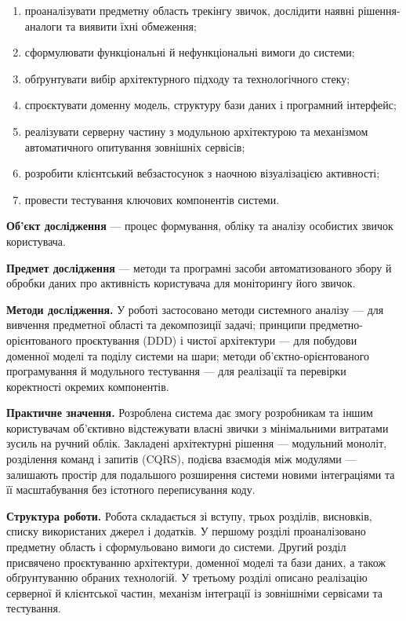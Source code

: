 \begin{enumerate}[noitemsep, topsep=2pt, leftmargin=*, label=\arabic*)]
    \item проаналізувати предметну область трекінгу звичок, дослідити наявні рішення-аналоги та виявити їхні обмеження;
    \item сформулювати функціональні й нефункціональні вимоги до системи;
    \item обґрунтувати вибір архітектурного підходу та технологічного стеку;
    \item спроєктувати доменну модель, структуру бази даних і програмний інтерфейс;
    \item реалізувати серверну частину з модульною архітектурою та механізмом автоматичного опитування зовнішніх сервісів;
    \item розробити клієнтський вебзастосунок з наочною візуалізацією активності;
    \item провести тестування ключових компонентів системи.
\end{enumerate}

\textbf{Об'єкт дослідження} — процес формування, обліку та аналізу особистих звичок користувача.

\textbf{Предмет дослідження} — методи та програмні засоби автоматизованого збору й обробки даних про активність користувача для моніторингу його звичок.

\textbf{Методи дослідження.} У роботі застосовано методи системного аналізу — для вивчення предметної області та декомпозиції задачі; принципи предметно-орієнтованого проєктування (DDD) і чистої архітектури — для побудови доменної моделі та поділу системи на шари; методи об'єктно-орієнтованого програмування й модульного тестування — для реалізації та перевірки коректності окремих компонентів.

\textbf{Практичне значення.} Розроблена система дає змогу розробникам та іншим користувачам об'єктивно відстежувати власні звички з мінімальними витратами зусиль на ручний облік. Закладені архітектурні рішення — модульний моноліт, розділення команд і запитів (CQRS), подієва взаємодія між модулями — залишають простір для подальшого розширення системи новими інтеграціями та її масштабування без істотного переписування коду.

\textbf{Структура роботи.} Робота складається зі вступу, трьох розділів, висновків, списку використаних джерел і додатків. У першому розділі проаналізовано предметну область і сформульовано вимоги до системи. Другий розділ присвячено проєктуванню архітектури, доменної моделі та бази даних, а також обґрунтуванню обраних технологій. У третьому розділі описано реалізацію серверної й клієнтської частин, механізм інтеграції із зовнішніми сервісами та тестування.
